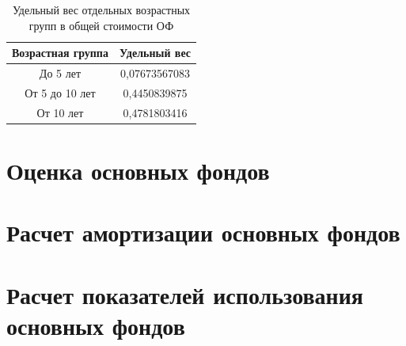 \begin{table}[H]
	\caption{Удельный вес отдельных возрастных групп в общей стоимости ОФ}
	\centering
	\begin{tabular}{|c|c|}
		\hline
		Возрастная группа & Удельный вес \\ \hline
		До 5 лет & 0,07673567083 \\ \hline
		От 5 до 10 лет & 0,4450839875 \\ \hline
		От 10 лет & 0,4781803416 \\ \hline

	\end{tabular}
	
\end{table}

\section{Оценка основных фондов}




\section{Расчет амортизации основных фондов}

\section{Расчет показателей использования основных фондов}